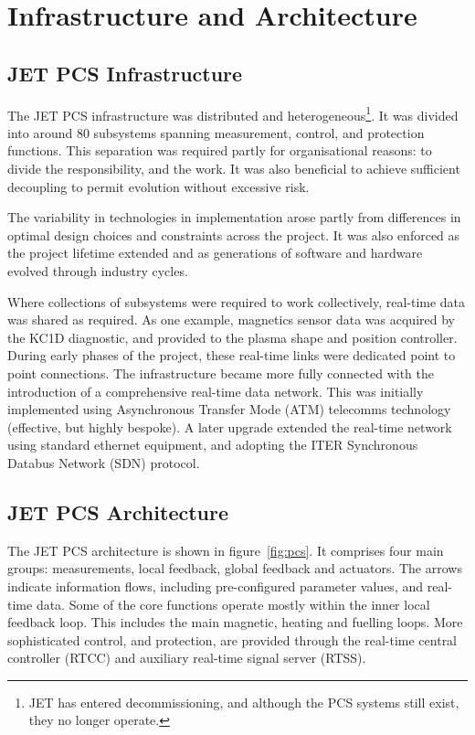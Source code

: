 \documentclass[5p]{elsarticle}
\begin{document}
\section{Infrastructure and Architecture}

\subsection{JET PCS Infrastructure}
\label{l_infrastructure}

The JET PCS infrastructure was distributed and
heterogeneous\footnote{JET has entered decommissioning, and although the PCS systems still exist, they no longer operate.}.  
It was divided into around 80 subsystems spanning measurement, control, and protection functions.
This separation was required partly for organisational reasons: to divide the responsibility, and the work.
It was also beneficial to achieve sufficient decoupling to permit evolution without excessive risk.

The variability in technologies in implementation arose partly from differences in
optimal design choices and constraints across the project.  It was also enforced
as the project lifetime extended and as generations of software and hardware
evolved through industry cycles.

Where collections of subsystems were required to work collectively, real-time data was
shared as required. As one example, magnetics sensor data was acquired by the KC1D
diagnostic, and provided to the plasma shape and position controller.  During early
phases of the project, these real-time links were dedicated point to point connections.
The infrastructure became more fully connected with the introduction of a comprehensive
real-time data network.  This was initially implemented using Asynchronous Transfer Mode (ATM)
telecomms technology (effective, but highly bespoke). A later upgrade extended the
real-time network using standard ethernet equipment, and adopting the ITER Synchronous Databus
Network (SDN) protocol.


\subsection{JET PCS Architecture}
\label{l_architecture}

The JET PCS architecture is shown in figure~\ref{fig:pcs}. 
It comprises four main groups: measurements, local feedback, global feedback and actuators.
The arrows indicate information flows, including pre-configured parameter values, and
real-time data.  Some of the core functions operate mostly within the inner local feedback
loop.  This includes the main magnetic, heating and fuelling loops.  More sophisticated
control, and protection, are provided through the real-time central controller (RTCC) 
and auxiliary real-time signal server (RTSS).
\end{document}

